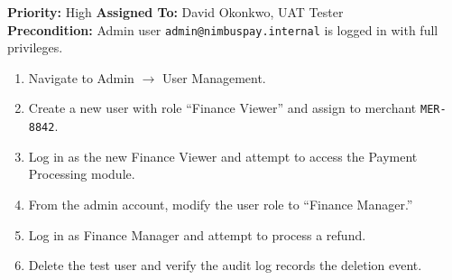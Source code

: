 \vspace{12pt}

\begin{tcolorbox}[
  enhanced,
  colback=white,
  colframe=accentBlue,
  boxrule=1pt,
  left=12pt,
  right=12pt,
  top=10pt,
  bottom=10pt,
  sharp corners,
  title={\textbf{TC-004: User Role Management \& Access Control}},
  fonttitle=\bfseries\color{white},
  colbacktitle=accentBlue
]
  \textbf{Priority:} High \hfill \textbf{Assigned To:} David Okonkwo, UAT Tester\\[4pt]
  \textbf{Precondition:} Admin user \texttt{admin@nimbuspay.internal} is logged in with full privileges.\\[4pt]

  \begin{tcolorbox}[
    enhanced,
    colback=bgLight,
    colframe=borderGray,
    boxrule=0.5pt,
    left=10pt,
    right=10pt,
    top=6pt,
    bottom=6pt,
    sharp corners,
    title={Test Steps},
    fonttitle=\bfseries\color{primaryNavy}
  ]
    \begin{enumerate}[nosep, leftmargin=*]
      \item Navigate to Admin $\rightarrow$ User Management.
      \item Create a new user with role ``Finance Viewer'' and assign to merchant \texttt{MER-8842}.
      \item Log in as the new Finance Viewer and attempt to access the Payment Processing module.
      \item From the admin account, modify the user role to ``Finance Manager.''
      \item Log in as Finance Manager and attempt to process a refund.
      \item Delete the test user and verify the audit log records the deletion event.
    \end{enumerate}
  \end{tcolorbox}

  \vspace{4pt}


\end{tcolorbox}
